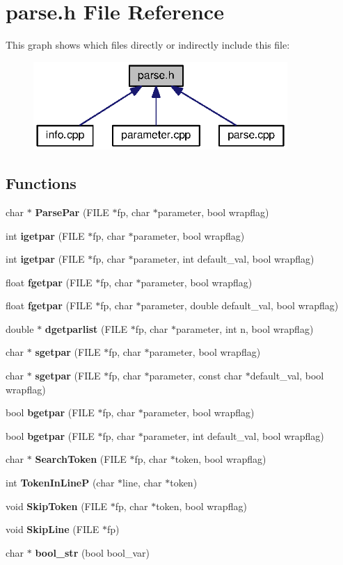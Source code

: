 \section{parse.\-h File Reference}
\label{parse_8h}
This graph shows which files directly or indirectly include this file\-:
\nopagebreak
\begin{figure}[H]
\begin{center}
\leavevmode
\includegraphics[width=274pt]{parse_8h__dep__incl}
\end{center}
\end{figure}
\subsection*{Functions}
\begin{DoxyCompactItemize}
\item 
char $\ast$ {\bf Parse\-Par} (F\-I\-L\-E $\ast$fp, char $\ast$parameter, bool wrapflag)
\item 
int {\bf igetpar} (F\-I\-L\-E $\ast$fp, char $\ast$parameter, bool wrapflag)
\item 
int {\bf igetpar} (F\-I\-L\-E $\ast$fp, char $\ast$parameter, int default\-\_\-val, bool wrapflag)
\item 
float {\bf fgetpar} (F\-I\-L\-E $\ast$fp, char $\ast$parameter, bool wrapflag)
\item 
float {\bf fgetpar} (F\-I\-L\-E $\ast$fp, char $\ast$parameter, double default\-\_\-val, bool wrapflag)
\item 
double $\ast$ {\bf dgetparlist} (F\-I\-L\-E $\ast$fp, char $\ast$parameter, int n, bool wrapflag)
\item 
char $\ast$ {\bf sgetpar} (F\-I\-L\-E $\ast$fp, char $\ast$parameter, bool wrapflag)
\item 
char $\ast$ {\bf sgetpar} (F\-I\-L\-E $\ast$fp, char $\ast$parameter, const char $\ast$default\-\_\-val, bool wrapflag)
\item 
bool {\bf bgetpar} (F\-I\-L\-E $\ast$fp, char $\ast$parameter, bool wrapflag)
\item 
bool {\bf bgetpar} (F\-I\-L\-E $\ast$fp, char $\ast$parameter, int default\-\_\-val, bool wrapflag)
\item 
char $\ast$ {\bf Search\-Token} (F\-I\-L\-E $\ast$fp, char $\ast$token, bool wrapflag)
\item 
int {\bf Token\-In\-Line\-P} (char $\ast$line, char $\ast$token)
\item 
void {\bf Skip\-Token} (F\-I\-L\-E $\ast$fp, char $\ast$token, bool wrapflag)
\item 
void {\bf Skip\-Line} (F\-I\-L\-E $\ast$fp)
\item 
char $\ast$ {\bf bool\-\_\-str} (bool bool\-\_\-var)
\end{DoxyCompactItemize}


